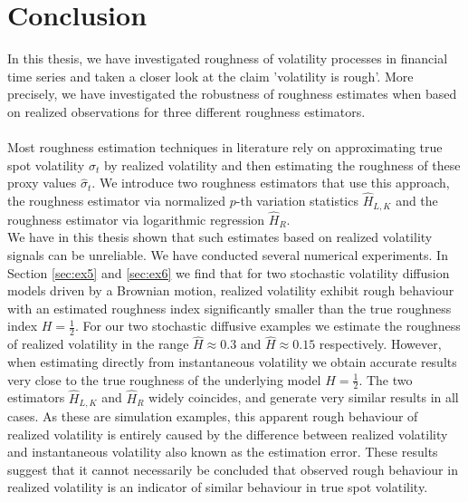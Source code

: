 \documentclass{article}
\begin{document}
\section{Conclusion}
In this thesis, we have investigated roughness of volatility processes in financial time series and taken a closer look at the claim 'volatility is rough'. More precisely, we have investigated the robustness of roughness estimates when based on realized observations for three different roughness estimators. \\\\
Most roughness estimation techniques in literature rely on approximating true spot volatility $\sigma_t$ by realized volatility and then estimating the roughness of these proxy values $\hat{\sigma}_t$. We introduce two roughness estimators that use this approach, the roughness estimator via normalized $p$-th variation statistics $\widehat{H}_{L,K}$ and the roughness estimator via logarithmic regression $\widehat{H}_R$.\\
We have in this thesis shown that such estimates based on realized volatility signals can be unreliable. We have conducted several numerical experiments. In Section \ref{sec:ex5} and \ref{sec:ex6} we find that for two stochastic volatility diffusion models driven by a Brownian motion, realized volatility exhibit rough behaviour with an estimated roughness index significantly smaller than the true roughness index $H=\frac{1}{2}$. For our two stochastic diffusive examples we estimate the roughness of realized volatility in the range $\widehat{H}\approx 0.3$ and $\widehat{H}\approx 0.15$ respectively. However, when estimating directly from instantaneous volatility we obtain accurate results very close to the true roughness of the underlying model $H=\frac{1}{2}$. The two estimators $\widehat{H}_{L,K}$ and $\widehat{H}_R$ widely coincides, and generate very similar results in all cases. As these are simulation examples, this apparent rough behaviour of realized volatility is entirely caused by the difference between realized volatility and instantaneous volatility also known as the estimation error. These results suggest that it cannot necessarily be concluded that observed rough behaviour in realized volatility is an indicator of similar behaviour in true spot volatility.\\\\
\end{document}
